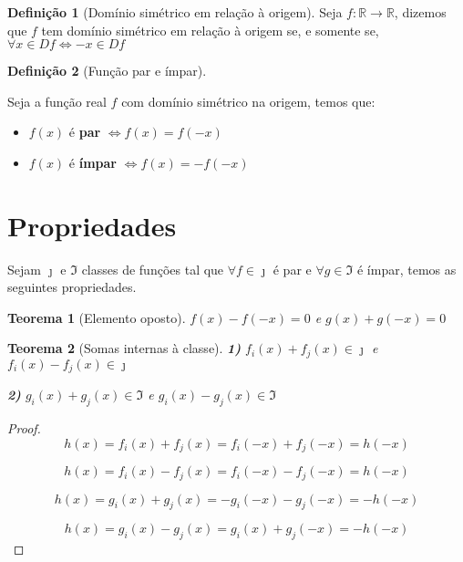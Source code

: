 \documentclass[
]{book}
\providecommand{\tightlist}{%
  \setlength{\itemsep}{0pt}\setlength{\parskip}{0pt}}
\newtheorem{theorem}{Teorema}[chapter]
\theoremstyle{definition}
\newtheorem{definition}{Definição}[chapter]
\theoremstyle{definition}
\theoremstyle{definition}
\theoremstyle{definition}
\theoremstyle{remark}
\begin{document}
\begin{definition}[Domínio simétrico em relação à origem]
\protect\hypertarget{def:defsimetriaorigem}{}\label{def:defsimetriaorigem}Seja \(f: \mathbb{R} \rightarrow \mathbb{R}\), dizemos que \(f\) tem domínio simétrico em relação à origem se, e somente se, \(\forall x \in Df \Leftrightarrow -x \in Df\)
\end{definition}

\begin{definition}[Função par e ímpar]
\protect\hypertarget{def:defparimpar}{}\label{def:defparimpar}

Seja a função real \(f\) com domínio simétrico na origem, temos que:

\begin{itemize}
\tightlist
\item
  \(f(x)\) é \textbf{par} \(\Leftrightarrow f(x) = f(-x)\)
\item
  \(f(x)\) é \textbf{ímpar} \(\Leftrightarrow f(x) = -f(-x)\)
\end{itemize}

\end{definition}

\section{Propriedades}\label{propriedades}

Sejam \(\jmath\) e \(\Im\) classes de funções tal que \(\forall f \in \jmath\) é par e \(\forall g \in \Im\) é ímpar, temos as seguintes propriedades.

\begin{theorem}[Elemento oposto]
\(f(x) - f(-x) = 0\) e \(g(x)+g(-x)=0\)
\end{theorem}

\begin{theorem}[Somas internas à classe]
\textbf{1)} \(f_i(x) + f_j(x) \in \jmath\) e \(f_i(x) - f_j(x) \in \jmath\)

\textbf{2)} \(g_i(x) + g_j(x) \in \Im\) e \(g_i(x) - g_j(x) \in \Im\)
\end{theorem}

\begin{proof}
\[
h(x) = f_i(x)+f_j(x)=f_i(-x)+f_j(-x)=h(-x)
\]

\[
h(x) = f_i(x)-f_j(x) = f_i(-x)-f_j(-x)=h(-x)
\]

\[
h(x)=g_i(x)+g_j(x)=-g_i(-x)-g_j(-x)=-h(-x)
\]

\[
h(x)=g_i(x)-g_j(x)=g_i(x)+g_j(-x)=-h(-x)
\]
\end{proof}
\end{document}
